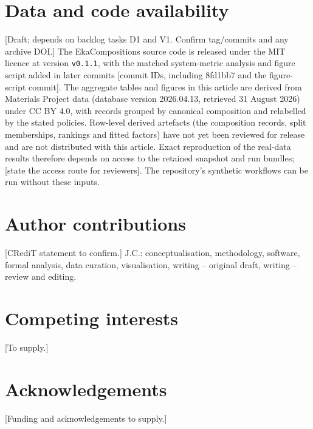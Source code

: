 \documentclass[11pt,a4paper]{article}
\newif\ifshownotes\shownotestrue
\newcommand{\authornote}[1]{\ifshownotes{\color{red!70!black}\textsf{\small[#1]}}\fi}
\begin{document}
\section*{Data and code availability}
\authornote{Draft; depends on backlog tasks D1 and V1. Confirm tag/commits and any archive DOI.}
The EkaCompositions source code is released under the MIT licence at version \texttt{v0.1.1}, with the matched system-metric analysis and figure script added in later commits \authornote{commit IDs, including 8fd1bb7 and the figure-script commit}. The aggregate tables and figures in this article are derived from Materials Project data (database version 2026.04.13, retrieved 31 August 2026) under CC BY 4.0, with records grouped by canonical composition and relabelled by the stated policies. Row-level derived artefacts (the composition records, split memberships, rankings and fitted factors) have not yet been reviewed for release and are not distributed with this article. Exact reproduction of the real-data results therefore depends on access to the retained snapshot and run bundles; \authornote{state the access route for reviewers}. The repository's synthetic workflows can be run without these inputs.

\section*{Author contributions}
\authornote{CRediT statement to confirm.} J.C.: conceptualisation, methodology, software, formal analysis, data curation, visualisation, writing -- original draft, writing -- review and editing.

\section*{Competing interests}
\authornote{To supply.}

\section*{Acknowledgements}
\authornote{Funding and acknowledgements to supply.}




\clearpage
\appendix
\renewcommand{\thefigure}{S\arabic{figure}}
\renewcommand{\thetable}{S\arabic{table}}
\setcounter{figure}{0}
\setcounter{table}{0}
\end{document}

